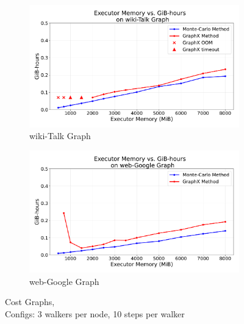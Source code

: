 \begin{figure}[H]
    \centering
    \begin{subfigure}[t]{0.5\linewidth}
        \centering
        \includegraphics[width=\linewidth]{images/plots/wiki-Talk/gbhrs_nodes_wiki_talk.pdf}
        \caption{wiki-Talk Graph}
        \label{fig:wikirun}
    \end{subfigure}\hfill
    \begin{subfigure}[t]{0.5\linewidth}
        \centering
        \includegraphics[width=\linewidth]{images/plots/web-Google/gbhrs_nodes_web_google.pdf}
        \caption{web-Google Graph}
        \label{fig:wikigibhrs}
    \end{subfigure}
    \caption{Cost Graphs, \\ Configs: 3 walkers per node, 10 steps per walker}
\end{figure}


